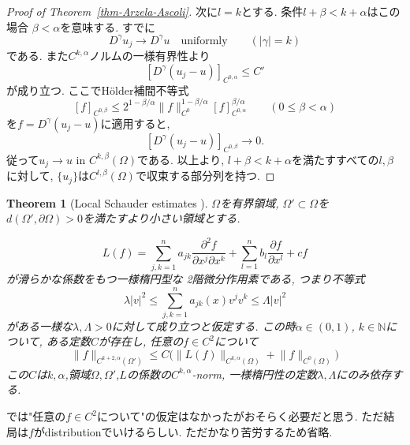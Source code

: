 \documentclass[dvipdfmx,a4paper,11pt]{article} %
\newtheorem{thm}{Theorem}[section]
\theoremstyle{definition}
\theoremstyle{remark}
\numberwithin{equation}{section}
\begin{document}
\begin{proof}[Proof of Theorem~\ref{thm-Arzela-Ascoli}]
次に$l=k$とする. 条件$l+\beta<k+\alpha$はこの場合
$\beta<\alpha$を意味する. すでに
\[
  D^\gamma u_j\to D^\gamma u
  \quad \text{uniformly}
  \qquad (\lvert\gamma\rvert=k)
\]
である. また$C^{k,\alpha}$ノルムの一様有界性より
\[
  [D^\gamma(u_j-u)]_{C^{0,\alpha}}\leq C'
\]
が成り立つ. ここでH\"older補間不等式
\[
  [f]_{C^{0,\beta}}
  \leq
  2^{1-\beta/\alpha}
  \lVert f\rVert_{C^0}^{1-\beta/\alpha}
  [f]_{C^{0,\alpha}}^{\beta/\alpha}
  \qquad (0\leq \beta<\alpha)
\]
を$f=D^\gamma(u_j-u)$に適用すると,
\[
  [D^\gamma(u_j-u)]_{C^{0,\beta}}
  \longrightarrow 0.
\]
従って$u_j\to u$ in $C^{k,\beta}(\Omega)$である.
以上より, $l+\beta<k+\alpha$を満たすすべての$l,\beta$に対して,
$\{u_j\}$は$C^{l,\beta}(\Omega)$で収束する部分列を持つ.
\end{proof}


\begin{thm}[Local Schauder estimates {\cite[Theorem 2.7]{Sze14}}]
\label{thm-Sze-2.7}
$\Omega$を有界領域, 
$\Omega'\subset\Omega$を$d(\Omega',\partial\Omega)>0$を満たすより小さい領域とする. 

\[
L(f)=\sum_{j,k=1}^n a_{jk}\frac{\partial^2 f}{\partial x^j\partial x^k}
+\sum_{l=1}^n b_l\frac{\partial f}{\partial x^l}+cf
\]
が滑らかな係数をもつ一様楕円型な 2階微分作用素である, つまり不等式
\begin{equation}
\label{Sze-Schauder-18}
\lambda\lvert v\rvert^2\leq \sum_{j,k=1}^n a_{jk}(x)v^jv^k \leq \Lambda\lvert v\rvert^2
\end{equation}
がある一様な$\lambda,\Lambda>0$に対して成り立つと仮定する.
この時$\alpha\in(0,1)$, $k\in\mathbb{N}$について, 
ある定数$C$が存在し, 任意の$f \in C^2$について
\[
\lVert f\rVert_{C^{k+2,\alpha}(\Omega')}\leq C\bigl(\lVert L(f)\rVert_{C^{k,\alpha}(\Omega)}+\lVert f\rVert_{C^0(\Omega)}\bigr)
\]
この$C$は$k,\alpha$,領域$\Omega,\Omega'$,$L$の係数の$C^{k,\alpha}$-norm,  一様楕円性の定数$\lambda,\Lambda$にのみ依存する. 
\end{thm}
\cite[Theorem 2.7]{Sze14}では"任意の$f \in C^2$について"の仮定はなかったがおそらく必要だと思う.
ただ結局は$f$がdistributionでいけるらしい. ただかなり苦労するため省略.  
\end{document}
